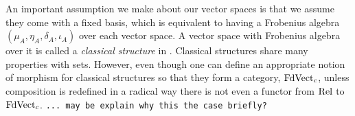 An important assumption we make about our vector spaces is that we
assume they come with a fixed basis, which is equivalent to having a
Frobenius algebra $(\mu_A,\eta_A,\delta_A,\iota_A)$ over each vector
space. A vector space with Frobenius algebra over it is called
a \emph{classical structure} in \cite{CoeckePaquettePavlovic}. Classical
structures share many properties with sets. However, even though one
can define an appropriate notion of morphism for classical structures
so that they form a category, $\mathrm{FdVect}_c$, unless 
composition is redefined in a radical way there is not even a functor
from $\mathrm{Rel}$ to $\mathrm{FdVect}_c$.
{\tt ... may be explain why this the case briefly?}

